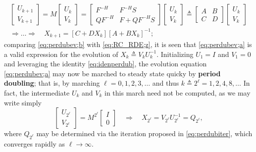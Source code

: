 \begin{subequations}
\label{eq:perdubev}
\begin{gather}
\begin{bmatrix} U_{k+1} \\ V_{k+1} \end{bmatrix} = M \begin{bmatrix} U_{k} \\ V_{k} \end{bmatrix}
   = \begin{bmatrix} F^{-H} & F^{-H}S \\ Q F^{-H} & F+ Q F^{-H}S \end{bmatrix} \begin{bmatrix} U_{k} \\ V_{k} \end{bmatrix}
   \triangleq \begin{bmatrix} A & B \\ C & D \end{bmatrix}\begin{bmatrix} U_{k} \\ V_{k} \end{bmatrix} \label{eq:perdubev;a} \\
\Rightarrow \ldots \Rightarrow \quad X_{k+1}=[C+D X_k][A+B X_k]^{-1}; \label{eq:perdubev;b}
\end{gather}
\end{subequations}
comparing \eqref{eq:perdubev;b} with \eqref{eq:RC_RDE;z}, it is seen that \eqref{eq:perdubev;a} is a valid expression for the evolution of $X_k \triangleq V_k U_k^{-1}$.  Initializing $U_1=I$ and $V_1=0$ and leveraging the identity \eqref{eq:idenperdub}, the
evolution equation \eqref{eq:perdubev;a} may now be marched to steady state quicky by {\bf period doubling}; that is,
by marching $\ell=0,1,2,3,\ldots$ and thus $k\triangleq 2^\ell=1,2,4,8,\ldots$
In fact, the intermediate $U_k$ and $V_k$ in this march need not be computed, as we may write simply
\begin{equation*}
\begin{bmatrix} U_{2^\ell} \\ V_{2^\ell} \end{bmatrix} = M^{2^\ell} \begin{bmatrix} I \\ 0 \end{bmatrix} \quad \Rightarrow \quad X_{2^\ell} = V_{2^\ell} U_{2^\ell}^{-1} = Q_{2^\ell},
\end{equation*}
where $Q_{2^\ell}$ may be determined via the iteration proposed in \eqref{eq:perdubiter}, which converges rapidly as $\ell \rightarrow \infty$.

